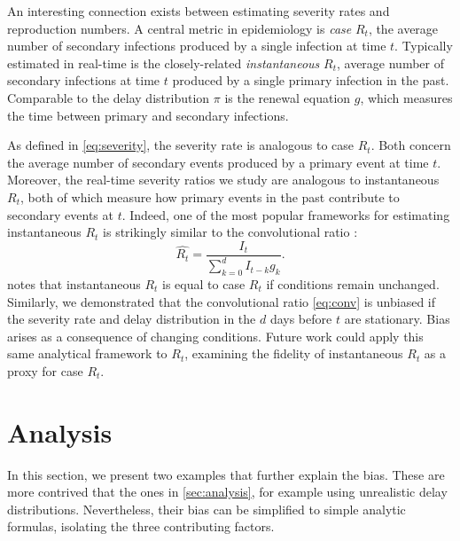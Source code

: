 \documentclass{article}
\begin{document}
An interesting connection exists between estimating severity rates and reproduction numbers. A central metric in epidemiology is \textit{case} $R_t$, the average number of secondary infections produced by a single infection at time $t$. Typically estimated in real-time is the closely-related \textit{instantaneous} $R_t$, average number of secondary infections at time $t$ produced by a single primary infection in the past. Comparable to the delay distribution $\pi$ is the renewal equation $g$, which measures the time between primary and secondary infections.

As defined in \ref{eq:severity}, the severity rate is analogous to case $R_t$. Both concern the average number of secondary events produced by a primary event at time $t$. Moreover, the real-time severity ratios we study are analogous to instantaneous $R_t$, both of which measure how primary events in the past contribute to secondary events at $t$. Indeed, one of the most popular frameworks for estimating instantaneous $R_t$ is strikingly similar to the convolutional ratio \citep{fraser2007,wallinga2007how,cori2013new}:
\begin{equation}\label{eq:instRt}
    \hat{R_t} = \frac{I_t}{\sum_{k=0}^d I_{t-k}g_k}.
\end{equation}
\citet{fraser2007} notes that instantaneous $R_t$ is equal to case $R_t$ if conditions remain unchanged. Similarly, we demonstrated that the convolutional ratio \ref{eq:conv} is unbiased if the severity rate and delay distribution in the $d$ days before $t$ are stationary. Bias arises as a consequence of changing conditions. Future work could apply this same analytical framework to $R_t$, examining the fidelity of instantaneous $R_t$ as a proxy for case $R_t$. 





\pagebreak
\appendix
\section{Analysis}\label{apx:analysis}

In this section, we present two examples that further explain the bias. These are more contrived that the ones in \ref{sec:analysis}, for example using unrealistic delay distributions. Nevertheless, their bias can be simplified to simple analytic formulas, isolating the three contributing factors.
\end{document}
